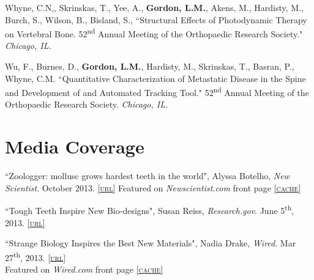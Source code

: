 Whyne, C.N,, Skrinskas, T., Yee, A., \textbf{Gordon, L.M.}, Akens, M., Hardisty, M., Burch, S., Wilson, B., Bisland, S., ``Structural Effects of Photodynamic Therapy on Vertebral Bone. 52\textsuperscript{nd} Annual Meeting of the Orthopaedic Research Society." \emph{Chicago, IL.}

Wu, F., Burnes, D., \textbf{Gordon, L.M.}, Hardisty, M., Skrinskas, T., Basran, P., Whyne, C.M. ``Quantitative Characterization of Metastatic Disease in the Spine and Development of and Automated Tracking Tool." 52\textsuperscript{nd} Annual Meeting of the Orthopaedic Research Society. \emph{Chicago, IL.}
\endgroup

\section*{Media Coverage}

``Zoologger: mollusc grows hardest teeth in the world", Alyssa Botelho, \emph{New Scientist}. October 2013. \href{http://www.newscientist.com/article/dn24329-zoologger-mollusc-grows-hardest-teeth-in-the-world.html#.Uk7GpMakpHV}{\textsc{\footnotesize{[url]}}} Featured on \emph{Newscientist.com} front page \href{http://lylegordon.ca/newsci.jpg}{\textsc{\footnotesize{[cache]}}}
\begingroup\setlength{\parskip}{0.1cm}

``Tough Teeth Inspire New Bio-designs", Susan Reiss, \emph{Research.gov}. June 5\textsuperscript{th}, 2013. \href{http://www.research.gov/research-portal/appmanager/base/desktop;jsessionid=hFFMRyhFTMl4CQ76t1456YQ7LXd1RJYjQGVG1gmHP2Jcsny3ryW0!2110096251!130307470?_nfpb=true&_windowLabel=assetsInTheStates_1&_urlType=action&assetsInTheStates_1_action=selectAwardDetail&assetsInTheStates_1_id=%2FresearchGov/AwardHighlight/PublicAffairs/23492_ToughTeethInspireNewBio-designs.html}{\textsc{\footnotesize{[url]}}} 

``Strange Biology Inspires the Best New Materials", Nadia Drake, \emph{Wired}. Mar 27\textsuperscript{th}, 2013. \href{http://www.wired.com/wiredscience/2013/03/biomimetic-materials/?utm_source=feedburner&utm_medium=feed&utm_campaign=Feed%3A+wired%2Findex+%28Wired%3A+Top+Stories%29&pid=6577}{\textsc{\footnotesize{[url]}}}\\ Featured on \emph{Wired.com} front page \href{http://lylegordon.ca/wired.jpg}{\textsc{\footnotesize{[cache]}}}

